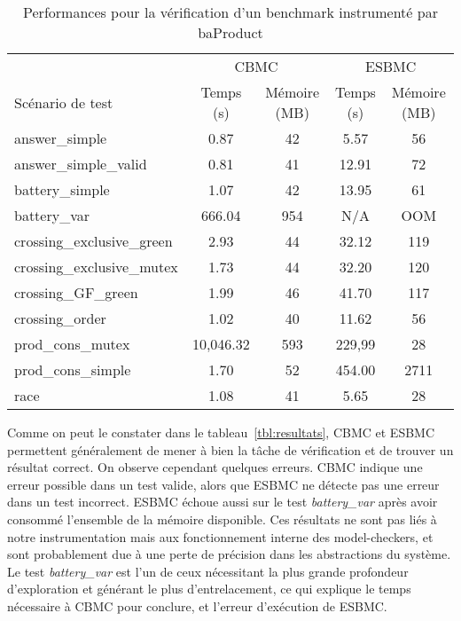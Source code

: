 \begin{table}[tbp]
\centering
\caption{Performances pour la vérification d'un benchmark instrumenté par baProduct}
\label{tbl:performances}
\begin{tabular}{|l|c|c|c|c|}
\hline
                           & \multicolumn{2}{c|}{CBMC} & \multicolumn{2}{c|}{ESBMC}\\
Scénario de test           & Temps (s) & Mémoire (MB) & Temps (s) & Mémoire (MB) \\
\hline
answer\_simple             & 0.87      & 42           & 5.57      & 56           \\
answer\_simple\_valid      & 0.81      & 41           & 12.91     & 72           \\
battery\_simple            & 1.07      & 42           & 13.95     & 61           \\
battery\_var               & 666.04    & 954          & N/A       & OOM          \\
crossing\_exclusive\_green & 2.93      & 44           & 32.12     & 119          \\
crossing\_exclusive\_mutex & 1.73      & 44           & 32.20     & 120          \\
crossing\_GF\_green        & 1.99      & 46           & 41.70     & 117          \\
crossing\_order            & 1.02      & 40           & 11.62     & 56           \\
prod\_cons\_mutex          & 10,046.32 & 593          & 229,99    & 28           \\
prod\_cons\_simple         & 1.70      & 52           & 454.00    & 2711         \\
race                       & 1.08      & 41           & 5.65      & 28           \\
\hline
\end{tabular}
\end{table}

Comme on peut le constater dans le tableau~\ref{tbl:resultats}, CBMC et ESBMC
permettent généralement de mener à bien la tâche de vérification et de trouver
un résultat correct. On observe cependant quelques erreurs. CBMC indique une
erreur possible dans un test valide, alors que ESBMC ne détecte pas une erreur
dans un test incorrect. ESBMC échoue aussi sur le test \emph{battery\_var} après
avoir consommé l'ensemble de la mémoire disponible. Ces résultats ne sont pas
liés à notre instrumentation mais aux fonctionnement interne des model-checkers,
et sont probablement due à une perte de précision dans les abstractions du système.
Le test \emph{battery\_var} est l'un de ceux nécessitant la plus grande
profondeur d'exploration et générant le plus d'entrelacement, ce qui explique
le temps nécessaire à CBMC pour conclure, et l'erreur d'exécution de ESBMC.

